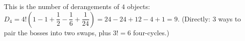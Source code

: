This is the number of derangements of $4$ objects: $D_4=4!\left(1-1+\dfrac{1}{2}-\dfrac{1}{6}+\dfrac{1}{24}\right)=24-24+12-4+1=\boxed{9}$. (Directly: $3$ ways to pair the bosses into two swaps, plus $3!=6$ four-cycles.)
